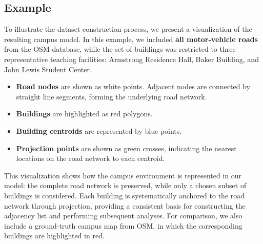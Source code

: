 \documentclass[fleqn,10pt]{olplainarticle}
\begin{document}
\subsection*{Example}
To illustrate the dataset construction process, we present a visualization of the resulting campus model. In this example, we included \textbf{all motor-vehicle roads} from the OSM database, while the set of buildings was restricted to three representative teaching facilities: Armstrong Residence Hall, Baker Building, and John Lewis Student Center.
\begin{itemize}
    \item \textbf{Road nodes} are shown as white points. Adjacent nodes are connected by straight line segments, forming the underlying road network.
    \item \textbf{Buildings} are highlighted as red polygons.
    \item \textbf{Building centroids} are represented by blue points.
    \item \textbf{Projection points} are shown as green crosses, indicating the nearest locations on the road network to each centroid.
\end{itemize}

This visualization shows how the campus environment is represented in our model: the complete road network is preserved, while only a chosen subset of buildings is considered. Each building is systematically anchored to the road network through projection, providing a consistent basis for constructing the adjacency list and performing subsequent analyses. For comparison, we also include a ground-truth campus map from OSM, in which the corresponding buildings are highlighted in red.
\end{document}
